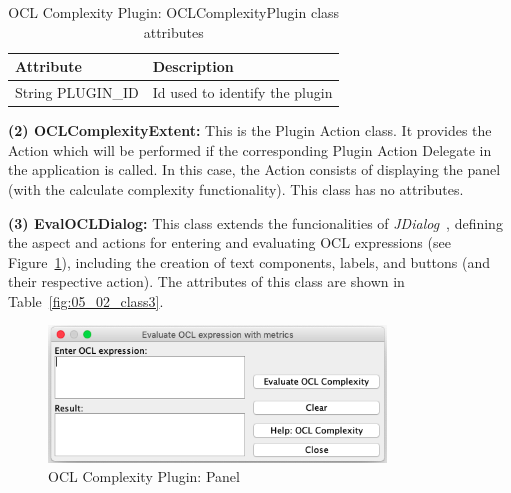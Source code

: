 \begin{table}[ht]
\centering
\begin{tabular}{@{}ll@{}}
\toprule
\textbf{Attribute} & \textbf{Description}           \\ \midrule
String PLUGIN\_ID         & Id used to identify the plugin \\ \bottomrule
\end{tabular}
\caption{OCL Complexity Plugin: OCLComplexityPlugin class attributes}
\label{fig:05_02_class1}
\end{table}

\textbf{(2) OCLComplexityExtent:} This is the Plugin Action class. It provides the Action which will be performed if the corresponding Plugin Action Delegate in the application is called. In this case, the Action consists of displaying the panel (with the calculate complexity functionality). This class has no attributes.

\textbf{(3) EvalOCLDialog:} This class extends the funcionalities of \textit{JDialog}~\cite{javaxswing}, defining the aspect and actions for entering and evaluating OCL expressions (see Figure~\ref{fig:05_02_panel}), including the creation of text components, labels, and buttons (and their respective action). The attributes of this class are shown in Table~\ref{fig:05_02_class3}. 

\begin{figure}[ht]
    \centering
    \includegraphics[width=0.8\textwidth]{Chapters/figures/5_Implementation/02_Panel}
    \caption{OCL Complexity Plugin: Panel}
    \label{fig:05_02_panel}
\end{figure}


